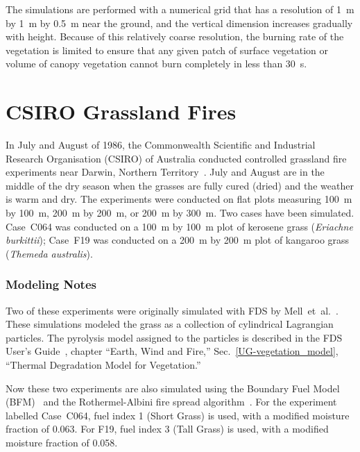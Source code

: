 The simulations are performed with a numerical grid that has a resolution of 1~m by 1~m by 0.5~m near the ground, and the vertical dimension increases gradually with height. Because of this relatively coarse resolution, the burning rate of the vegetation is limited to ensure that any given patch of surface vegetation or volume of canopy vegetation cannot burn completely in less than 30~s.





\section{CSIRO Grassland Fires}
\label{CSIRO_Grassland_Fires_Description}

In July and August of 1986, the Commonwealth Scientific and Industrial Research Organisation (CSIRO) of Australia conducted controlled grassland fire experiments near Darwin, Northern Territory~\cite{Cheney:IJWF1993}. July and August are in the middle of the dry season when the grasses are fully cured (dried) and the weather is warm and dry. The experiments were conducted on flat plots measuring 100~m by 100~m, 200~m by 200~m, or 200~m by 300~m. Two cases have been simulated. Case~C064 was conducted on a 100~m by 100~m plot of kerosene grass ({\it Eriachne burkittii}); Case~F19 was conducted on a 200~m by 200~m plot of kangaroo grass ({\it Themeda australis}).

\subsubsection{Modeling Notes}

Two of these experiments were originally simulated with FDS by Mell~et~al.~\cite{Mell:IJWF2007}. These simulations modeled the grass as a collection of cylindrical Lagrangian particles. The pyrolysis model assigned to the particles is described in the FDS User's Guide~\cite{FDS_Users_Guide}, chapter ``Earth, Wind and Fire,'' Sec.~\ref{UG-vegetation_model}, ``Thermal Degradation Model for Vegetation.''

Now these two experiments are also simulated using the Boundary Fuel Model (BFM)~\cite{Perez-Ramirez:FT2017} and the Rothermel-Albini fire spread algorithm~\cite{Rothermel:1972,Albini:1976}. For the experiment labelled Case~C064, fuel index 1 (Short Grass) is used, with a modified moisture fraction of 0.063. For F19, fuel index 3 (Tall Grass) is used, with a modified moisture fraction of 0.058.

